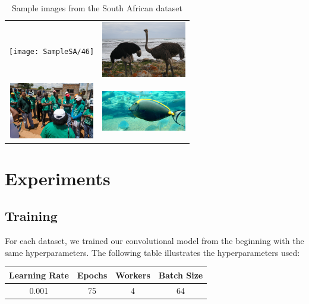 \documentclass[conference]{IEEEtran}
\begin{document}
\begin{table}[h!]
\centering
\begin{tabular}{cc}
\texttt{[image: SampleSA/46]} & \includegraphics[width=3.7cm]{SampleSA/61}\\
\includegraphics[width=3.7cm]{SampleSA/106} & \includegraphics[width=3.7cm]{SampleSA/127}\\

\end{tabular}
\caption{Sample images from the South African dataset}
\label{fig:samplesa}
\end{table}

\section{Experiments}

%
%
%
%
%

\subsection{Training}

For each dataset, we trained our convolutional model from the beginning with the same hyperparameters. The following table illustrates the hyperparameters used:


\begin{table}[h]
\centering
\renewcommand{\arraystretch}{1.5}
\begin{tabular}{|c|c|c|c|}
\hline 
Learning Rate & Epochs & Workers & Batch Size \\ 
\hline 
0.001 & 75 & 4 & 64 \\ 
\hline 
\end{tabular} 
\end{table}
\end{document}
